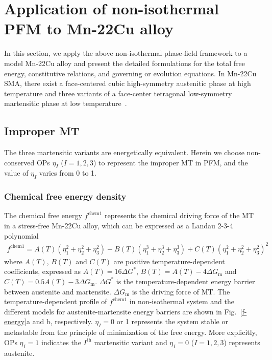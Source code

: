 \documentclass[reprint,3p,sort&compress,times,onecolumn]{elsarticle}
\begin{document}


\section{Application of non-isothermal PFM to Mn-22Cu alloy} \label{sec-application}  
In this section, we apply the above non-isothermal phase-field framework to a model Mn-22Cu alloy and present the detailed formulations for the total free energy, constitutive relations, and governing or evolution equations. In Mn-22Cu SMA, there exist a face-centered cubic high-symmetry austenitic phase at high temperature and three variants of a face-center tetragonal low-symmetry martensitic phase at low temperature~\cite{daly2007stress,shimizu1982crystallographic}. 

\subsection{Improper MT}

The three martensitic variants are energetically equivalent. Herein we choose non-conserved OPs $\eta_I$ ($I = 1, 2, 3$) to represent the improper MT in PFM, and the value of $\eta_I$ varies from 0 to 1.


\subsubsection{Chemical free energy density}
The chemical free energy $f^{\text{chem1}}$ represents the chemical driving force of the MT in a stress-free Mn-22Cu alloy, which can be expressed as a Landau 2-3-4 polynomial
\begin{equation}
\begin{split}
f^\text{chem1} =  A(T)(\eta_1^2+\eta_2^2+\eta_3^2) - B(T) (\eta_1^3+\eta_2^3+\eta_3^3) +C(T) (\eta_1^2+\eta_2^2+\eta_3^2)^2 
\end{split}
\end{equation}
where $A(T)$, $B(T)$ and $C(T)$ are positive temperature-dependent coefficients, expressed as $A(T)=16\Delta G^*$, $B(T)=A(T)-4\Delta G_{\text{m}}$ and $C(T)=0.5A(T)-3\Delta G_{\text{m}}$. $\Delta G^*$ is the temperature-dependent energy barrier between austenite and martensite. $\Delta G_{\text{m}}$ is the driving force of MT. The temperature-dependent profile of $f^{\text{chem1}}$ in non-isothermal system and the different models for austenite-martensite energy barriers are shown in Fig.~\ref{f-energy}a and b, respectively. $\eta_I=0$ or 1 represents the system stable or metastable from the principle of minimization of the free energy. More explicitly, OPs $\eta_I=1$ indicates the $I^{\text{th}}$ martensitic variant and $\eta_I=0$ ($I=1,2,3$) represents austenite.
\end{document}
